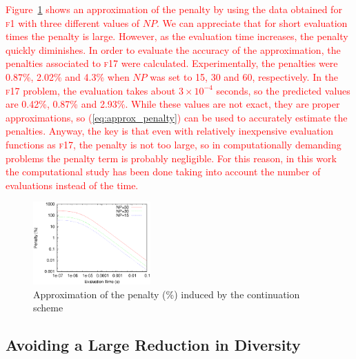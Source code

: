 \documentclass[preprint,3p]{elsarticle}
\begin{document}
\textcolor{red}{
Figure~\ref{fig:time} shows an approximation of the penalty by using the data obtained for \textsc{f1} with three different values of $NP$.
%
We can appreciate that for short evaluation times the penalty is large.
%
However, as the evaluation time increases, the penalty quickly diminishes.
%
In order to evaluate the accuracy of the approximation, the penalties associated to \textsc{f17} were calculated.
%
Experimentally, the penalties were 0.87\%, 2.02\% and 4.3\% when $NP$ was set to 15, 30 and 60, respectively.
%
In the \textsc{f17} problem, the evaluation takes about $3 \times 10^{-4}$ seconds, so the predicted values are
0.42\%, 0.87\% and 2.93\%.
%
While these values are not exact, they are proper approximations, so (\ref{eq:approx_penalty}) can be used to accurately estimate the penalties.
%
Anyway, the key is that even with relatively inexpensive evaluation functions as \textsc{f17}, the penalty is not too large, so
in computationally demanding problems the penalty term is probably negligible.
%
For this reason, in this work the computational study has been done taking into account the number of evaluations instead of the time.
}

\begin{figure}[!t]
\centering
\includegraphics[width=0.40\textwidth]{images/Time/timePrediction.eps}
\caption{Approximation of the penalty (\%) induced by the continuation scheme}
\label{fig:time}
\end{figure}

\subsection{Avoiding a Large Reduction in Diversity}
\end{document}
